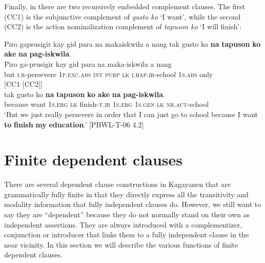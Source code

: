 Finally, in  there are two recursively embedded complement clauses. The first (CC1) is the subjunctive complement of \textit{gusto ko} ‘I want’, while the second (CC2) is the action nominalization complement of \textit{tapuson ko} ‘I will finish’:

\ea
\label{bkm:Ref474828944}
Piro  gaprusigir  kay  gid  para  na  makaiskwila  a  nang tak  gusto  ko  \textbf{na}  \textbf{tapuson}  \textbf{ko} \textbf{ake}  \textbf{na}  \textbf{pag-iskwila}. \smallskip\\

\gll Piro  ga-prusigir  kay  gid  para  na  maka-iskwila  a  nang \\
but  \textsc{i.r}-persevere  1\textsc{p.exc.abs}  \textsc{int}  \textsc{purp}  \textsc{lk}  \textsc{i.hap.ir}-school  1\textsc{s.abs}  only  \\
\glt \hspace{3cm}[\hspace{1.2cm}CC1\hspace{1.2cm} [\hspace{1.6cm}CC2\hspace{1.6cm}]] \\
\gll tak  gusto  ko  \textbf{na}  \textbf{tapuson}  \textbf{ko}  \textbf{ake}  \textbf{na}  \textbf{pag-iskwila}. \\
because  want  1\textsc{s.erg}     \textsc{lk}  finish-\textsc{t.ir}  1\textsc{s.erg}  1\textsc{s.gen}  \textsc{lk}  \textsc{nr.act}-school \\
\glt `But we just really persevere in order that I can just go to school because I want \textbf{to} \textbf{finish} \textbf{my} \textbf{education}.’ [PBWL-T-06 4.2] \\
\z
\section{Finite dependent clauses}
\label{bkm:Ref474473773}
There are several dependent clause constructions in Kagayanen that are grammatically fully finite in that they directly express all the transitivity and modality information that fully independent clauses do. However, we still want to say they are “dependent” because they do not normally stand on their own as independent assertions. They are always introduced with a complementizer, conjunction or introducer that links them to a fully independent clause in the near vicinity. In this section we will describe the various functions of finite dependent clauses.


